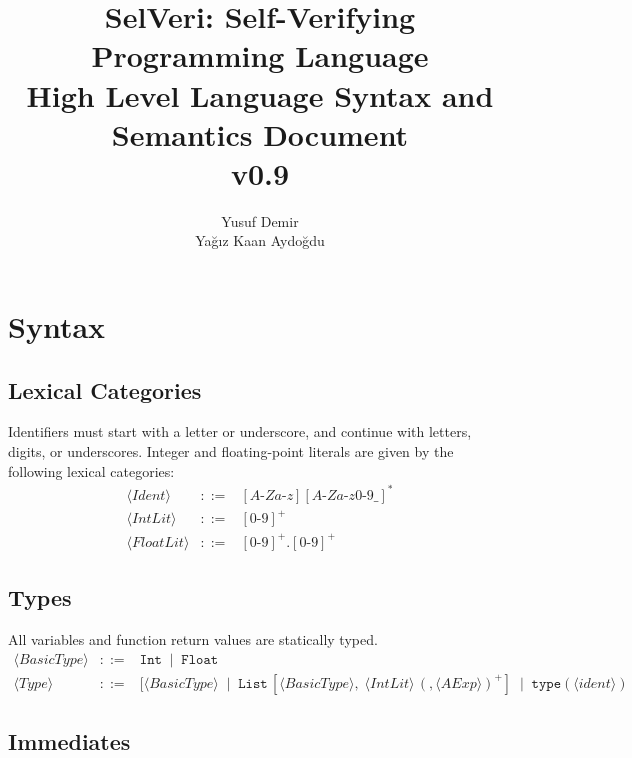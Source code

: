 \documentclass{article}
\title{SelVeri: Self-Verifying Programming Language \\ High Level Language Syntax and Semantics Document \\ v0.9}
\author{Yusuf Demir \\ Yağız Kaan Aydoğdu}
\begin{document}
\maketitle


\newpage
\section{Syntax}

\subsection{Lexical Categories}

Identifiers must start with a letter or underscore, and continue with letters, digits, or underscores.
Integer and floating-point literals are given by the following lexical categories:
\[
\begin{array}{rcl}
\langle \mathit{Ident} \rangle &::=& [A\texttt{-}Za\texttt{-}z][A\texttt{-}Za\texttt{-}z0\texttt{-}9\_]^* \\
\langle \mathit{IntLit} \rangle &::=& [0\texttt{-}9]^+ \\
\langle \mathit{FloatLit} \rangle &::=& [0\texttt{-}9]^+\texttt{.}[0\texttt{-}9]^+
\end{array}
\]

\subsection{Types}

All variables and function return values are statically typed.
\[
\begin{array}{rcl}
\langle \mathit{BasicType} \rangle
&::=&
\mathtt{Int}
\;\mid\;
\mathtt{Float} \\[4pt]



\langle \mathit{Type} \rangle
&::=&
[\langle \mathit{BasicType} \rangle
\;\mid\;
\mathtt{List}\,[\langle \mathit{BasicType} \rangle,\; \langle \mathit{IntLit} \rangle\, (,\langle \mathit{AExp} \rangle)^+]
\;\mid\;
\mathtt{type(\langle \mathit{ident} \rangle)}
\end{array}
\]

\subsection{Immediates}
\end{document}
